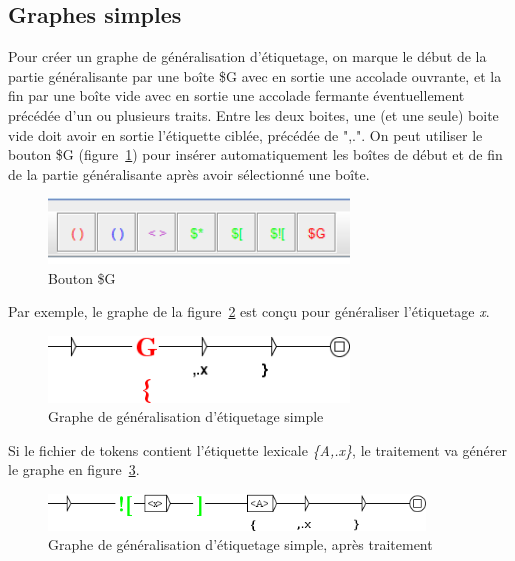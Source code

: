 \subsection{Graphes simples}

Pour créer un graphe de généralisation d'étiquetage, on marque le début de la partie
généralisante par une boîte \$G avec en sortie une accolade ouvrante, et la fin
par une boîte vide avec en sortie une accolade fermante éventuellement précédée
d'un ou plusieurs traits. Entre les deux boites, une (et une seule) boite vide
doit avoir en sortie l'étiquette ciblée, précédée de ",.". On peut utiliser
le bouton \$G (figure~\ref{fig:bouton_g}) pour insérer automatiquement les boîtes
de début et de fin de la partie généralisante après avoir sélectionné une boîte.

\begin{figure}[!htb]
  \centering
  \includegraphics[width=8cm]{resources/img/bouton_g.png}
  \caption{Bouton \$G}
  \label{fig:bouton_g}
\end{figure}

\bigskip
\noindent Par exemple, le graphe de la figure~\ref{fig:graphe_gener_simple}
est conçu pour généraliser l'étiquetage \textit{x}.

\begin{figure}[!htb]
  \centering
  \includegraphics[width=8cm]{resources/img/graphe_generique_simple.png}
  \caption{Graphe de généralisation d'étiquetage simple}
  \label{fig:graphe_gener_simple}
\end{figure}

\bigskip
\noindent Si le fichier de tokens contient l'étiquette lexicale \emph{\{A,.x\}}, le traitement
va générer le graphe en figure~\ref{fig:graphe_gener_simple_genere}.

\begin{figure}[!htb]
  \centering
  \includegraphics[width=10cm]{resources/img/graphe_generique_simple_genere.png}
  \caption{Graphe de généralisation d'étiquetage simple, après traitement}
  \label{fig:graphe_gener_simple_genere}
\end{figure}

